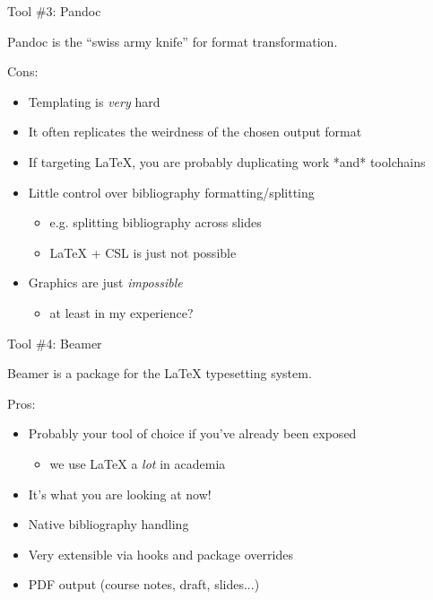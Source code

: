 \documentclass[aspectratio=169]{fireshonks}
\begin{document}
\begin{frame}{Tool \#3: Pandoc}
  \begin{center}
    Pandoc is the \enquote{swiss army knife} for format transformation.
  \end{center}

  Cons:

  \begin{itemize}
    \item Templating is \emph{very} hard
    \item It often replicates the weirdness of the chosen output format
    \item If targeting LaTeX, you are probably duplicating work *and* toolchains
    \item Little control over bibliography formatting/splitting
          \begin{itemize}
            \item e.g. splitting bibliography across slides
            \item LaTeX + CSL is just not possible
          \end{itemize}
    \item Graphics are just \emph{impossible}
          \begin{itemize}
            \item at least in my experience?
          \end{itemize}
  \end{itemize}
\end{frame}
\begin{frame}{Tool \#4: Beamer}
  \begin{center}
    Beamer is a package for the LaTeX typesetting system.
  \end{center}

  Pros:
  \begin{itemize}
    \item Probably your tool of choice if you've already been exposed
          \begin{itemize}
            \item we use LaTeX a \emph{lot} in academia
          \end{itemize}
    \item It's what you are looking at now!
    \item Native bibliography handling
    \item Very extensible via hooks and package overrides
    \item PDF output (course notes, draft, slides...)
  \end{itemize}
\end{frame}
\end{document}
